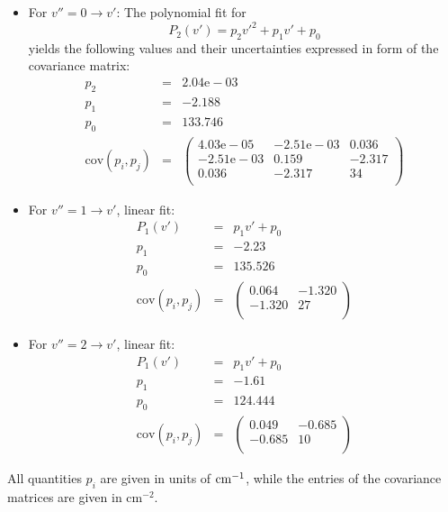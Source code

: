 \begin{itemize}
    \item For $v'' = 0 \rightarrow v'$: The polynomial fit for 
        \begin{equation}
            P_2(v') = p_2 {v'}^2 + p_1 v' + p_0
        \end{equation}
        yields the following values and their uncertainties expressed in form of 
        the covariance matrix:
        \begin{eqnarray}
            p_2 &=& 2.04\mathrm{e}-03 \\
            p_1 &=& -2.188 \\
            p_0 &=& 133.746 \\
            \mathrm{cov}(p_i, p_j) &=& 
            \begin{pmatrix}
                 4.03\mathrm{e}-05 & -2.51\mathrm{e}-03 & 0.036 \\
                 -2.51\mathrm{e}-03 & 0.159 & -2.317 \\
                 0.036 & -2.317 & 34 \\
            \end{pmatrix}
        \end{eqnarray}
    \item For $v'' = 1 \rightarrow v'$, linear fit:
        \begin{eqnarray}
            P_1(v') &=& p_1 v' + p_0 \\
            p_1 &=& -2.23 \\
            p_0 &=& 135.526 \\
            \mathrm{cov}(p_i, p_j) &=& 
            \begin{pmatrix}
                 0.064 & -1.320 \\
                 -1.320 & 27 \\
            \end{pmatrix}
        \end{eqnarray}
    \item For $v'' = 2 \rightarrow v'$, linear fit:
        \begin{eqnarray}
            P_1(v') &=& p_1 v' + p_0 \\
            p_1 &=& -1.61\\
            p_0 &=& 124.444 \\
            \mathrm{cov}(p_i, p_j) &=& 
            \begin{pmatrix}
                 0.049 & -0.685 \\
                 -0.685 & 10 \\
            \end{pmatrix}
        \end{eqnarray}
\end{itemize}
All quantities $p_i$ are given in units of $\mathrm{cm^{-1}}$, while the entries of the covariance 
matrices are given in $\mathrm{cm^{-2}}$.

